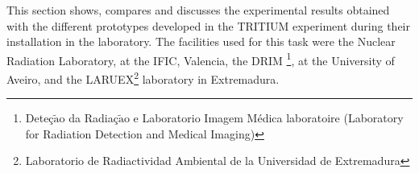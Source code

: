 This section shows, compares and discusses the experimental results obtained with the different prototypes developed in the TRITIUM experiment during their installation in the laboratory. The facilities used for this task were the Nuclear Radiation Laboratory, at the IFIC, Valencia, the DRIM \footnote{Deteç$\tilde{\text{a}}$o da Radiaç$\tilde{\text{a}}$o e Laboratorio Imagem Médica laboratoire (Laboratory for Radiation Detection and Medical Imaging)}, at the University of Aveiro, and the LARUEX\footnote{Laboratorio de Radiactividad Ambiental de la Universidad de Extremadura} laboratory in Extremadura.